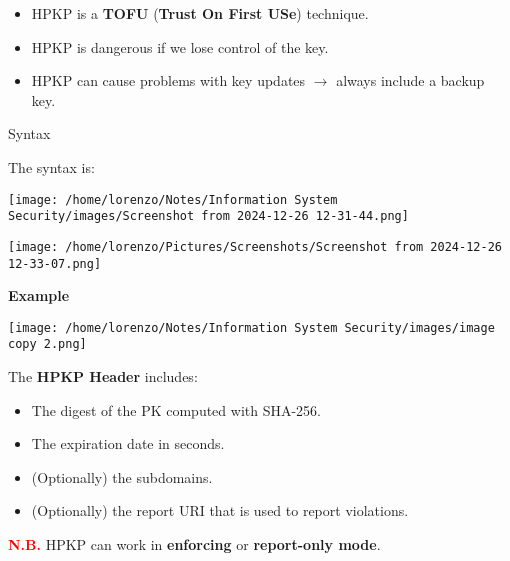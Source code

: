 \begin{itemize}
    \item HPKP is a \textbf{TOFU} (\textbf{Trust On First USe}) technique.
    \item HPKP is dangerous if we lose control of the key.
    \item HPKP can cause problems with key updates \(\rightarrow \) always include a backup key.
\end{itemize}
\begin{quotebox-grey}{Syntax}
    \begin{minipage}{0.4\textwidth}
        The syntax is:
        \begin{center}
            \texttt{[image: /home/lorenzo/Notes/Information System Security/images/Screenshot from 2024-12-26 12-31-44.png]} 
        \end{center} 
        \begin{center}
            \texttt{[image: /home/lorenzo/Pictures/Screenshots/Screenshot from 2024-12-26 12-33-07.png]} 
        \end{center}
        
    \end{minipage} 
    \hspace{1cm}
    \begin{minipage}{0.4\textwidth}
        \textbf{Example}
        \begin{center}
        \texttt{[image: /home/lorenzo/Notes/Information System Security/images/image copy 2.png]}
        \end{center}
    \end{minipage}
    The \textbf{HPKP Header} includes:
    \begin{itemize}
        \item The digest of the PK computed with SHA-256.
        \item The expiration date in seconds.
        \item (Optionally) the subdomains.
        \item (Optionally) the report URI that is used to report violations.
    \end{itemize}
    \textcolor{red}{\textbf{N.B.}} HPKP can work in \textbf{enforcing} or \textbf{report-only mode}.
\end{quotebox-grey}


